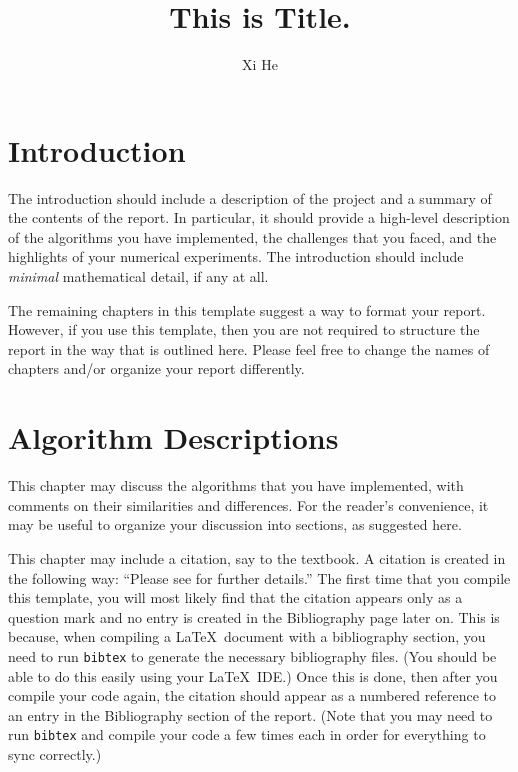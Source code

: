 \documentclass[11pt]{report}
\begin{document}
\author{Xi He}
\title {This is Title.}



\preface
\chapter{Introduction}

The introduction should include a description of the project and a summary of the contents of the report.  In particular, it should provide a high-level description of the algorithms you have implemented, the challenges that you faced, and the highlights of your numerical experiments.  The introduction should include \emph{minimal} mathematical detail, if any at all.

The remaining chapters in this template suggest a way to format your report.  However, if you use this template, then you are not required to structure the report in the way that is outlined here.  Please feel free to change the names of chapters and/or organize your report differently.

\chapter{Algorithm Descriptions}

This chapter may discuss the algorithms that you have implemented, with comments on their similarities and differences.  For the reader's convenience, it may be useful to organize your discussion into sections, as suggested here.

This chapter may include a citation, say to the textbook.  A citation is created in the following way: ``Please see \cite{NoceWrig06} for further details.''  The first time that you compile this template, you will most likely find that the citation appears only as a question mark and no entry is created in the Bibliography page later on.  This is because, when compiling a \LaTeX\ document with a bibliography section, you need to run \texttt{bibtex} to generate the necessary bibliography files.  (You should be able to do this easily using your \LaTeX\ IDE.)  Once this is done, then after you compile your code again, the citation should appear as a numbered reference to an entry in the Bibliography section of the report.  (Note that you may need to run \texttt{bibtex} and compile your code a few times each in order for everything to sync correctly.)
\end{document}
